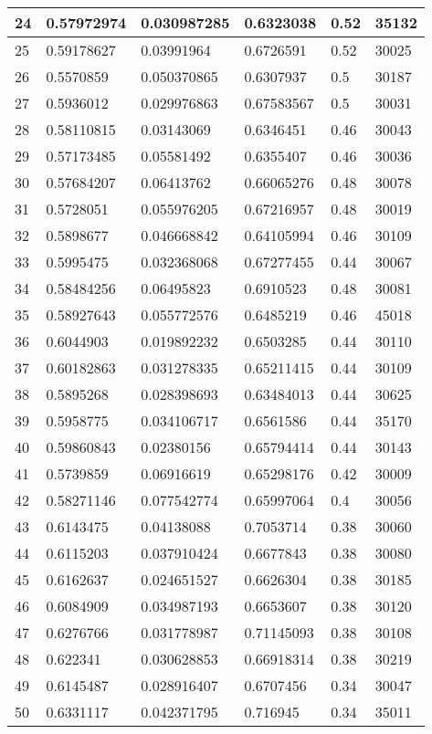 \begin{longtable}{|l|l|l|l|l|l|}
24 & 0.57972974 & 0.030987285 & 0.6323038 & 0.52 & 35132 \\ \hline 
25 & 0.59178627 & 0.03991964 & 0.6726591 & 0.52 & 30025 \\ \hline 
26 & 0.5570859 & 0.050370865 & 0.6307937 & 0.5 & 30187 \\ \hline 
27 & 0.5936012 & 0.029976863 & 0.67583567 & 0.5 & 30031 \\ \hline 
28 & 0.58110815 & 0.03143069 & 0.6346451 & 0.46 & 30043 \\ \hline 
29 & 0.57173485 & 0.05581492 & 0.6355407 & 0.46 & 30036 \\ \hline 
30 & 0.57684207 & 0.06413762 & 0.66065276 & 0.48 & 30078 \\ \hline 
31 & 0.5728051 & 0.055976205 & 0.67216957 & 0.48 & 30019 \\ \hline 
32 & 0.5898677 & 0.046668842 & 0.64105994 & 0.46 & 30109 \\ \hline 
33 & 0.5995475 & 0.032368068 & 0.67277455 & 0.44 & 30067 \\ \hline 
34 & 0.58484256 & 0.06495823 & 0.6910523 & 0.48 & 30081 \\ \hline 
35 & 0.58927643 & 0.055772576 & 0.6485219 & 0.46 & 45018 \\ \hline 
36 & 0.6044903 & 0.019892232 & 0.6503285 & 0.44 & 30110 \\ \hline 
37 & 0.60182863 & 0.031278335 & 0.65211415 & 0.44 & 30109 \\ \hline 
38 & 0.5895268 & 0.028398693 & 0.63484013 & 0.44 & 30625 \\ \hline 
39 & 0.5958775 & 0.034106717 & 0.6561586 & 0.44 & 35170 \\ \hline 
40 & 0.59860843 & 0.02380156 & 0.65794414 & 0.44 & 30143 \\ \hline 
41 & 0.5739859 & 0.06916619 & 0.65298176 & 0.42 & 30009 \\ \hline 
42 & 0.58271146 & 0.077542774 & 0.65997064 & 0.4 & 30056 \\ \hline 
43 & 0.6143475 & 0.04138088 & 0.7053714 & 0.38 & 30060 \\ \hline 
44 & 0.6115203 & 0.037910424 & 0.6677843 & 0.38 & 30080 \\ \hline 
45 & 0.6162637 & 0.024651527 & 0.6626304 & 0.38 & 30185 \\ \hline 
46 & 0.6084909 & 0.034987193 & 0.6653607 & 0.38 & 30120 \\ \hline 
47 & 0.6276766 & 0.031778987 & 0.71145093 & 0.38 & 30108 \\ \hline 
48 & 0.622341 & 0.030628853 & 0.66918314 & 0.38 & 30219 \\ \hline 
49 & 0.6145487 & 0.028916407 & 0.6707456 & 0.34 & 30047 \\ \hline 
50 & 0.6331117 & 0.042371795 & 0.716945 & 0.34 & 35011 \\ \hline 
\end{longtable}